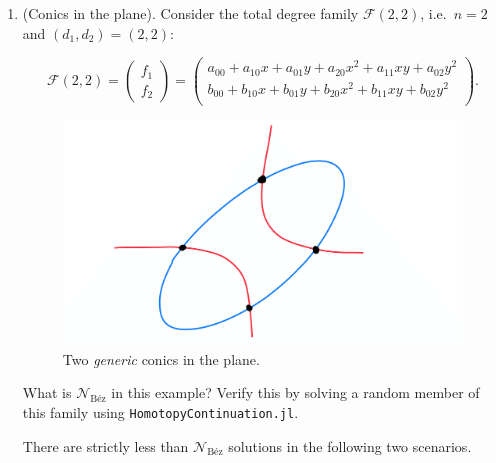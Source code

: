 \documentclass[11pt,reqno]{amsart}
\theoremstyle{definition}
\theoremstyle{remark}
\numberwithin{equation}{section}
\begin{document}
\begin{enumerate} 
\item (Conics in the plane). Consider the total degree family $\mathcal{F}(2,2)$, i.e.~$n = 2$ and $(d_1, d_2) = (2,2)$:

$$ \mathcal{F}(2,2) = \begin{pmatrix}
f_1 \\ f_2
\end{pmatrix}  = \begin{pmatrix}
a_{00} + a_{10} x + a_{01} y + a_{20}x^2 + a_{11}xy + a_{02} y^2 \\
b_{00} + b_{10} x + b_{01} y + b_{20}x^2 + b_{11}xy + b_{02} y^2 \\
\end{pmatrix}. $$
\begin{figure}
\centering
\includegraphics[scale=0.04]{Pictures_SANNA-4-1.png}
\caption{Two \emph{generic} conics in the plane.}
\end{figure}
What is $\mathcal{N}_{\text{Béz}}$ in this example? Verify this by solving a random member of this family using \texttt{HomotopyContinuation.jl}.

There are strictly less than $\mathcal{N}_{\text{Béz}}$  solutions in the following two scenarios.


\end{enumerate}
\end{document}
